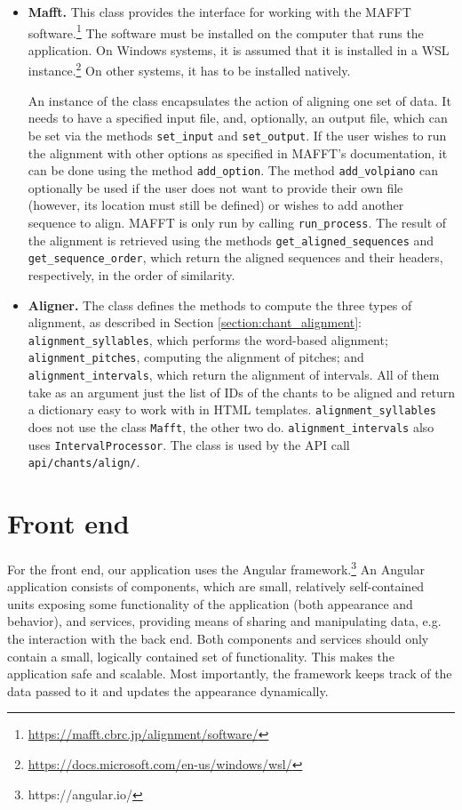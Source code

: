\begin{itemize}
\item\textbf{Mafft.} This class provides the interface for working with the MAFFT software.\footnote{\url{https://mafft.cbrc.jp/alignment/software/}} The software must be installed
on the computer that runs the application. On Windows systems, it is assumed that it is installed in a WSL instance.\footnote{\url{https://docs.microsoft.com/en-us/windows/wsl/}}
On other systems, it has to be installed natively.

An instance of the class encapsulates the action of aligning one set of data. It needs to have a specified input file, and, optionally, an output file, which can be set
via the methods \verb|set_input| and \verb|set_output|. If the user wishes to run the alignment with other options as specified in MAFFT's documentation, it can be done
using the method \verb|add_option|. The method \verb|add_volpiano| can optionally be used if the user does not want to provide their own file (however, its location must
still be defined) or wishes to add another sequence to align. MAFFT is only run by calling \verb|run_process|. The result of the alignment is retrieved using the methods
\verb|get_aligned_sequences| and \verb|get_sequence_order|, which return the aligned sequences and their headers, respectively, in the order of similarity.

\item\textbf{Aligner.} The class defines the methods to compute the three types of alignment, as described in Section \ref{section:chant_alignment}: \verb|alignment_syllables|,
which performs the word-based alignment; \verb|alignment_pitches|, computing the alignment of pitches; and \verb|alignment_intervals|, which return the alignment of 
intervals. All of them take as an argument just the list of IDs of the chants to be aligned and return a dictionary easy to work with in HTML templates. \verb|alignment_syllables|
does not use the class \verb|Mafft|, the other two do. \verb|alignment_intervals| also uses \verb|IntervalProcessor|. The class is used by the API call \verb|api/chants/align/|.

\end{itemize}

\section{Front end}

For the front end, our application uses the Angular framework.\footnote{https://angular.io/} An Angular application
consists of components, which are small, relatively self-contained units exposing some functionality of the application (both appearance and behavior), and
services, providing means of sharing and manipulating data, e.g. the interaction with the back end. Both components and services should only contain
a small, logically contained set of functionality. This makes the application safe and scalable. Most importantly, the framework keeps track of the data
passed to it and updates the appearance dynamically.

